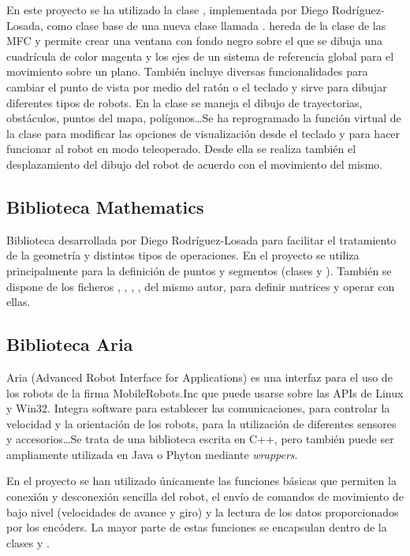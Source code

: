 En este proyecto se ha utilizado la clase , implementada por Diego Rodríguez-Losada, como clase base de una nueva clase llamada  .  hereda de la clase  de las MFC y permite crear una ventana con fondo negro sobre el que se dibuja una cuadrícula de color magenta y los ejes de un sistema de referencia global para el movimiento sobre un plano. También incluye diversas funcionalidades para cambiar el punto de vista por medio del ratón o el teclado y sirve para dibujar diferentes tipos de robots. En la clase  se maneja el dibujo de trayectorias, obstáculos, puntos del mapa, polígonos\ldots Se ha reprogramado la función virtual  de la clase  para modificar las opciones de visualización desde el teclado y para hacer funcionar al robot en modo teleoperado. Desde ella se realiza también el desplazamiento del dibujo del robot de acuerdo con el movimiento del mismo.

\subsection{Biblioteca Mathematics}
Biblioteca desarrollada por Diego Rodríguez-Losada para facilitar el tratamiento de la geometría y distintos tipos de operaciones. En el proyecto se utiliza principalmente para la definición de puntos y segmentos (clases  y ). También se dispone de los ficheros , , ,  , del mismo autor, para definir matrices y operar con ellas.


\subsection{Biblioteca Aria}

Aria (Advanced Robot Interface for Applications) es una interfaz para el uso de los robots de la firma MobileRobots.Inc que puede usarse sobre las APIs de Linux y Win32. Integra software para establecer las comunicaciones, para controlar la velocidad y la orientación de los robots, para la utilización de diferentes sensores y accesorios\ldots Se trata de una biblioteca escrita en C++, pero también puede ser ampliamente utilizada en Java o Phyton mediante \emph{wrappers}.

En el proyecto se han utilizado únicamente las funciones básicas que permiten la conexión y desconexión sencilla del robot, el envío de comandos de movimiento de bajo nivel (velocidades de avance y giro) y la lectura de los datos proporcionados por los encóders. La mayor parte de estas funciones se encapsulan dentro de la clases  y .

